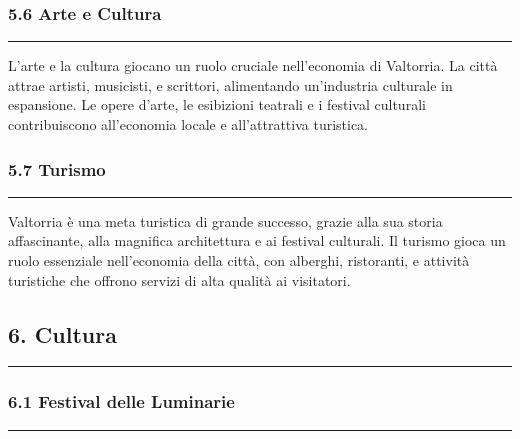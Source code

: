 \subsubsection{\texorpdfstring{5.6 \textbf{Arte e
Cultura}}{5.6 Arte e Cultura}}\label{arte-e-cultura}

\begin{center}\rule{0.5\linewidth}{0.5pt}\end{center}

L'arte e la cultura giocano un ruolo cruciale nell'economia di
Valtorria. La città attrae artisti, musicisti, e scrittori, alimentando
un'industria culturale in espansione. Le opere d'arte, le esibizioni
teatrali e i festival culturali contribuiscono all'economia locale e
all'attrattiva turistica.

\subsubsection{\texorpdfstring{5.7
\textbf{Turismo}}{5.7 Turismo}}\label{turismo}

\begin{center}\rule{0.5\linewidth}{0.5pt}\end{center}

Valtorria è una meta turistica di grande successo, grazie alla sua
storia affascinante, alla magnifica architettura e ai festival
culturali. Il turismo gioca un ruolo essenziale nell'economia della
città, con alberghi, ristoranti, e attività turistiche che offrono
servizi di alta qualità ai visitatori.

\subsection{6. Cultura}\label{cultura}

\begin{center}\rule{0.5\linewidth}{0.5pt}\end{center}

\subsubsection{\texorpdfstring{6.1 \textbf{Festival delle
Luminarie}}{6.1 Festival delle Luminarie}}\label{festival-delle-luminarie}

\begin{center}\rule{0.5\linewidth}{0.5pt}\end{center}

